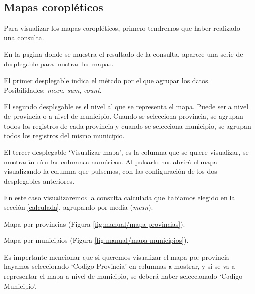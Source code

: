 \subsection{Mapas coropléticos}

Para visualizar los mapas coropléticos, primero tendremos que haber realizado una consulta.

En la página donde se muestra el resultado de la consulta, aparece una serie de desplegable para mostrar los mapas. 


El primer desplegable indica el método por el que agrupar los datos. Posibilidades: \textit{mean}, \textit{sum}, \textit{count}.

El segundo desplegable es el nivel al que se representa el mapa. Puede ser a nivel de provincia o a nivel de municipio. Cuando se selecciona provincia, se agrupan todos los registros de cada provincia y cuando se selecciona municipio, se agrupan todos los registros del mismo municipio.

El tercer desplegable `Visualizar mapa', es la columna que se quiere visualizar, se mostrarán sólo las columnas numéricas. Al pulsarlo nos abrirá el mapa visualizando la columna que pulsemos, con las configuración de los dos desplegables anteriores.


En este caso visualizaremos la consulta calculada que habíamos elegido en la sección \ref{calculada}, agrupando por media (\textit{mean}).

Mapa por provincias (Figura \ref{fig:manual/mapa-provincias}).


Mapa por municipios (Figura \ref{fig:manual/mapa-municipios}).


Es importante mencionar que si queremos visualizar el mapa por provincia hayamos seleccionado `Codigo Provincia' en columnas a mostrar, y si se va a representar el mapa a nivel de municipio, se deberá haber seleccionado `Codigo Municipio'. 



